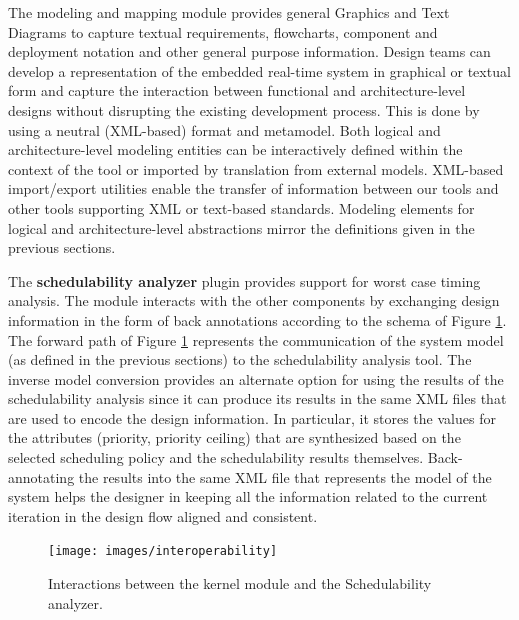 The modeling and mapping module provides general Graphics and Text
Diagrams to capture textual requirements, flowcharts, component and
deployment notation and other general purpose information. Design
teams can develop a representation of the embedded real-time system in
graphical or textual form and capture the interaction between
functional and architecture-level designs without disrupting the
existing development process. This is done by using a neutral
(XML-based) format and metamodel.  Both logical and architecture-level
modeling entities can be interactively defined within the context of
the tool or imported by translation from external models. XML-based
import/export utilities enable the transfer of information between our
tools and other tools supporting XML or text-based standards. Modeling
elements for logical and architecture-level abstractions mirror the
definitions given in the previous sections.

The \textbf{schedulability analyzer} plugin provides support for worst
case timing analysis. The module interacts with the other components
by exchanging design information in the form of back annotations
according to the schema of Figure
\ref{fig:schedulability-analysis-interactions}. The forward path of
Figure \ref{fig:schedulability-analysis-interactions} represents the
communication of the system model (as defined in the previous
sections) to the schedulability analysis tool. The inverse model
conversion provides an alternate option for using the results of the
schedulability analysis since it can produce its results in the same
XML files that are used to encode the design information. In
particular, it stores the values for the attributes (priority,
priority ceiling) that are synthesized based on the selected
scheduling policy and the schedulability results
themselves. Back-annotating the results into the same XML file that
represents the model of the system helps the designer in keeping all
the information related to the current iteration in the design flow
aligned and consistent.

\begin{figure}
\begin{center}
\texttt{[image: images/interoperability]}
\end{center}
\caption{Interactions between the kernel module and the Schedulability analyzer.}
\label{fig:schedulability-analysis-interactions}
\end{figure}


